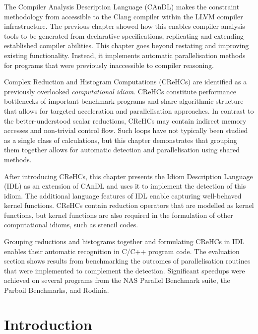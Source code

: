 
    The Compiler Analysis Description Language (CAnDL) makes the constraint
    methodology from  accessible to the Clang compiler
    within the LLVM compiler infrastructure.
    The previous chapter showed how this enables compiler analysis tools to be
    generated from declarative specifications, replicating and extending
    established compiler abilities.
    This chapter goes beyond restating and improving existing functionality.
    Instead, it implements automatic parallelisation methods for programs that
    were previously inaccessible to compiler reasoning.

    Complex Reduction and Histogram Computations (CReHCs) are identified as a
    previously overlooked  {\em computational idiom}.
    CReHCs constitute performance bottlenecks of important benchmark programs
    and share algorithmic structure that allows for targeted acceleration and
    parallelisation approaches.
    In contrast to the better-understood scalar reductions, CReHCs may contain
    indirect memory accesses and non-trivial control flow.
    Such loops have not typically been studied as a single class of
    calculations, but this chapter demonstrates that grouping them together
    allows for automatic detection and parallelisation using shared methods.

    After introducing CReHCs, this chapter presents the Idiom Description
    Language (IDL) as an extension of CAnDL and uses it to implement the
    detection of this idiom.
    The additional language features of IDL enable capturing well-behaved
    kernel functions.
    CReHCs contain reduction operators that are modelled as kernel functions,
    but kernel functions are also required in the formulation of other
    computational idioms, such as stencil codes.
    
    Grouping reductions and histograms together and formulating CReHCs in IDL
    enables their automatic recognition in C/C++ program code.
    The evaluation section shows results from benchmarking the outcomes of
    parallelisation routines that were implemented to complement the detection.
    Significant speedups were achieved on several programs from the
    NAS Parallel Benchmark suite, the Parboil Benchmarks, and Rodinia.

\section{Introduction}

